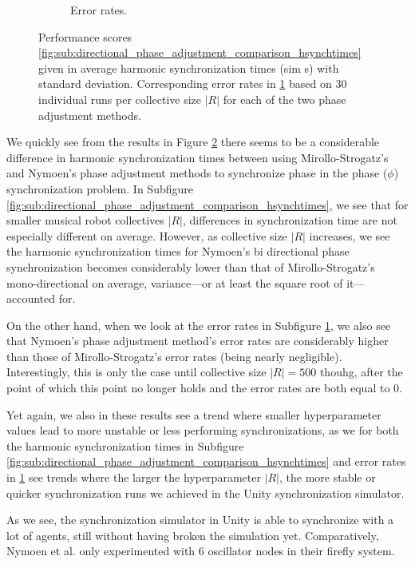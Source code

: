 \begin{figure}[ht!]
\begin{subfigure}[b]{0.5\textwidth}
		\caption{Error rates.}
		\label{fig:sub:directional_phase_adjustment_comparison_errorrates}
	  \end{subfigure}
	  \caption{Performance scores \ref{fig:sub:directional_phase_adjustment_comparison_hsynchtimes} given in average harmonic synchronization times (sim s) with standard deviation. Corresponding error rates in \ref{fig:sub:directional_phase_adjustment_comparison_errorrates} based on 30 individual runs per collective size $|R|$ for each of the two phase adjustment methods.}
	  \label{fig:directional_phase_adjustment_comparison}
	\end{figure}
	
	We quickly see from the results in Figure \ref{fig:directional_phase_adjustment_comparison} there seems to be a considerable difference in harmonic synchronization times between using Mirollo-Strogatz's and Nymoen's phase adjustment methods to synchronize phase in the phase ($\phi$) synchronization problem. In Subfigure \ref{fig:sub:directional_phase_adjustment_comparison_hsynchtimes}, we see that for smaller musical robot collectives $|R|$, differences in synchronization time are not especially different on average. However, as collective size $|R|$ increases, we see the harmonic synchronization times for Nymoen's bi directional phase synchronization becomes considerably lower than that of Mirollo-Strogatz's mono-directional on average, variance—or at least the square root of it—accounted for.
	
	On the other hand, when we look at the error rates in Subfigure \ref{fig:sub:directional_phase_adjustment_comparison_errorrates}, we also see that Nymoen's phase adjustment method's error rates are considerably higher than those of Mirollo-Strogatz's error rates (being nearly negligible). Interestingly, this is only the case until collective size $|R|=500$ thouhg, after the point of which this point no longer holds and the error rates are both equal to 0.
	
	Yet again, we also in these results see a trend where smaller hyperparameter values lead to more unstable or less performing synchronizations, as we for both the harmonic synchronization times in Subfigure \ref{fig:sub:directional_phase_adjustment_comparison_hsynchtimes} and error rates in \ref{fig:sub:directional_phase_adjustment_comparison_errorrates} see trends where the larger the hyperparameter $|R|$, the more stable or quicker synchronization runs we achieved in the Unity synchronization simulator.
	
	As we see, the synchronization simulator in Unity is able to synchronize with a lot of agents, still without having broken the simulation yet. Comparatively, Nymoen et al. \cite{nymoen_synch} only experimented with 6 oscillator nodes in their firefly system.
	
